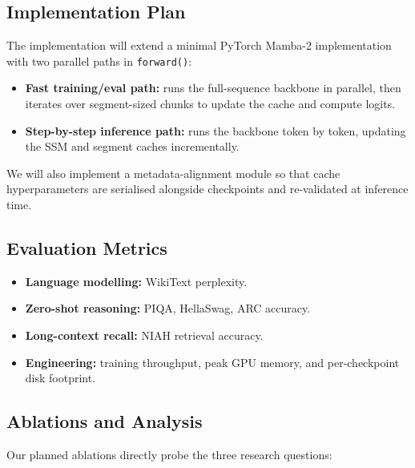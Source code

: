 \documentclass[conference]{IEEEtran}
\begin{document}
\subsection{Implementation Plan}

The implementation will extend a minimal PyTorch Mamba-2 implementation with two parallel paths in \texttt{forward()}:

\begin{itemize}
    \item \textbf{Fast training/eval path:} runs the full-sequence backbone in parallel, then iterates over segment-sized chunks to update the cache and compute logits.
    \item \textbf{Step-by-step inference path:} runs the backbone token by token, updating the SSM and segment caches incrementally.
\end{itemize}

We will also implement a metadata-alignment module so that cache hyperparameters are serialised alongside checkpoints and re-validated at inference time.

\subsection{Evaluation Metrics}

\begin{itemize}
    \item \textbf{Language modelling:} WikiText perplexity.
    \item \textbf{Zero-shot reasoning:} PIQA, HellaSwag, ARC accuracy.
    \item \textbf{Long-context recall:} NIAH retrieval accuracy.
    \item \textbf{Engineering:} training throughput, peak GPU memory, and per-checkpoint disk footprint.
\end{itemize}

\subsection{Ablations and Analysis}
\label{sec:ablations}

Our planned ablations directly probe the three research questions:
\end{document}
